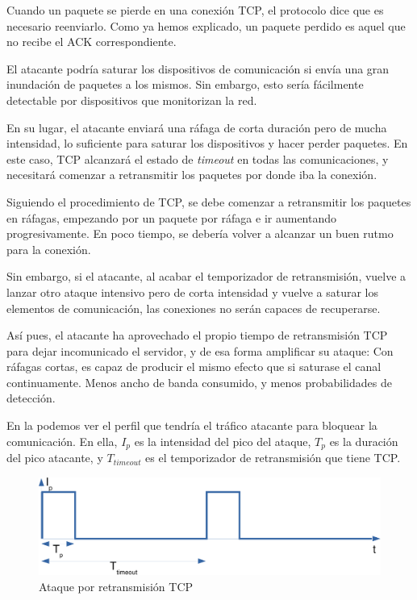 Cuando un paquete se pierde en una conexión \gls{TCP}, el protocolo dice que es necesario reenviarlo. Como ya hemos 
explicado, un paquete perdido es aquel que no recibe el \gls{ACK} correspondiente.

El atacante podría saturar los dispositivos de comunicación si envía una gran inundación de paquetes a los mismos. Sin 
embargo, esto sería fácilmente detectable por dispositivos que monitorizan la red.

En su lugar, el atacante enviará una ráfaga de corta duración pero de mucha intensidad, lo suficiente para saturar los 
dispositivos y hacer perder paquetes. En este caso, \gls{TCP} alcanzará el estado de \emph{timeout} en todas las 
comunicaciones, y necesitará comenzar a retransmitir los paquetes por donde iba la conexión.

Siguiendo el procedimiento de \gls{TCP}, se debe comenzar a retransmitir los paquetes en ráfagas, empezando por un 
paquete por ráfaga e ir aumentando progresivamente. En poco tiempo, se debería volver a alcanzar un buen rutmo para la 
conexión.

Sin embargo, si el atacante, al acabar el temporizador de retransmisión, vuelve a lanzar otro ataque intensivo pero de 
corta intensidad y vuelve a saturar los elementos de comunicación, las conexiones no serán capaces de recuperarse.

Así pues, el atacante ha aprovechado el propio tiempo de retransmisión \gls{TCP} para dejar incomunicado el servidor, y 
de esa forma amplificar su ataque: Con ráfagas cortas, es capaz de producir el mismo efecto que si saturase el canal 
continuamente. Menos ancho de banda consumido, y menos probabilidades de detección.

En la  podemos ver el perfil que tendría el tráfico atacante para bloquear la comunicación. En ella, 
$I_p$ es la intensidad del pico del ataque, $T_p$ es la duración del pico atacante, y $T_{timeout}$ es el temporizador 
de retransmisión que tiene \gls{TCP}.

\begin{figure}[htbp]
\centering
\includegraphics[width=\textwidth]{CapituloDDoS/Figuras/RTO_attack}
\caption{Ataque por retransmisión TCP}
\end{figure}
%

